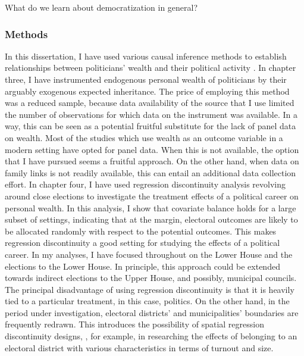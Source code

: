 What do we learn about democratization in general?

\subsubsection{Methods}

In this dissertation, I have used various causal inference methods to establish relationships between politicians' wealth and their political activity \citep{cunningham2021causal}. In chapter three, I have instrumented endogenous personal wealth of politicians by their arguably exogenous expected inheritance. The price of employing this method was a reduced sample, because data availability of the source that I use limited the number of observations for which data on the instrument was available. In a way, this can be seen as a potential fruitful substitute for the lack of panel data on wealth. Most of the studies which use wealth as an outcome variable \citep{fisman2014private, berg2020politicians, berg2020returns} in a modern setting have opted for panel data. When this is not available, the option that I have pursued seems a fruitful approach. On the other hand, when data on family links is not readily available, this can entail an additional data collection effort. In chapter four, I have used regression discontinuity analysis revolving around close elections to investigate the treatment effects of a political career on personal wealth. In this analysis, I show that covariate balance holds for a large subset of settings, indicating that at the margin, electoral outcomes are likely to be allocated randomly with respect to the potential outcomes. This makes regression discontinuity a good setting for studying the effects of a political career. In my analyses, I have focused throughout on the Lower House and the elections to the Lower House. In principle, this approach could be extended towards indirect elections to the Upper House, and possibly, municipal councils. The principal disadvantage of using regression discontinuity is that it is heavily tied to a particular treatment, in this case, politics. On the other hand, in the period under investigation, electoral districts' and municipalities' boundaries are frequently redrawn. This introduces the possibility of spatial regression discontinuity designs, \citep[e.g.][]{dell2010persistent, egger2015causal, lowes2021concessions}, for example, in researching the effects of belonging to an electoral district with various characteristics in terms of turnout and size. 

